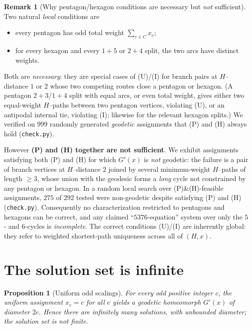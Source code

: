 \documentclass{amsart}
\newtheorem{proposition}{Proposition}
\theoremstyle{definition}
\newtheorem{remark}{Remark}
\begin{document}
\begin{remark}[Why pentagon/hexagon conditions are necessary but \emph{not}
sufficient]\label{rem:PHonly}
Two natural \emph{local} conditions are
\begin{itemize}
\item[\textnormal{(P)}] every pentagon has odd total weight $\sum_{e\in C}x_e$;
\item[\textnormal{(H)}] for every hexagon and every $1{+}5$ or $2{+}4$ split, the
two arcs have distinct weights.
\end{itemize}
Both are \emph{necessary}: they are special cases of (U)/(I) for branch pairs at
$H$--distance $1$ or $2$ whose two competing routes close a pentagon or hexagon.
(A pentagon $2{+}3$/$1{+}4$ split with equal arcs, or even total weight, gives
either two equal-weight $H$--paths between two pentagon vertices, violating (U),
or an antipodal internal tie, violating (I); likewise for the relevant hexagon
splits.) We verified on $999$ randomly generated \emph{geodetic} assignments that
(P) and (H) always hold (\texttt{check.py}).

However \textbf{(P) and (H) together are not sufficient}. We exhibit assignments
satisfying both (P) and (H) for which $G'(x)$ is \emph{not} geodetic: the failure
is a pair of branch vertices at $H$--distance $2$ joined by several
minimum-weight $H$--paths of length $\ge3$, whose union with the geodesic forms a
\emph{long} cycle not constrained by any pentagon or hexagon. In a random local
search over (P)\&(H)-feasible assignments, $275$ of $292$ tested were non-geodetic
despite satisfying (P) and (H) (\texttt{check.py}). Consequently no characterization
restricted to pentagons and hexagons can be correct, and any claimed
``$5376$-equation'' system over only the $5$- and $6$-cycles is \emph{incomplete}.
The correct conditions (U)/(I) are inherently global: they refer to weighted
shortest-path uniqueness across all of $(H,x)$.
\end{remark}

\section{The solution set is infinite}

\begin{proposition}[Uniform odd scalings]\label{prop:infinite}
For every odd positive integer $c$, the uniform assignment $x_e=c$ for all $e$
yields a geodetic homeomorph $G'(x)$ of diameter $2c$. Hence there are infinitely
many solutions, with unbounded diameter; the solution set is not finite.
\end{proposition}
\end{document}

